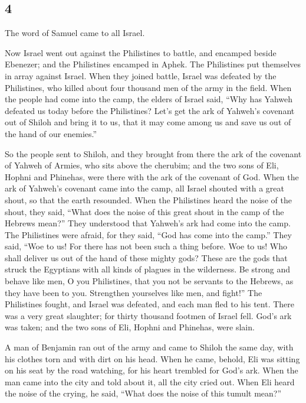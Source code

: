 \begin{paracol}{2}
\switchcolumn
\begin{otherlanguage}{english}

\hypertarget{section-7}{%
\section{4}\label{section-7}}

 The word of Samuel came to all Israel.

Now Israel went out against the Philistines to battle, and encamped
beside Ebenezer; and the Philistines encamped in Aphek. 
The Philistines put themselves in array against Israel. When they joined
battle, Israel was defeated by the Philistines, who killed about four
thousand men of the army in the field.  When the people
had come into the camp, the elders of Israel said, ``Why has Yahweh
defeated us today before the Philistines? Let's get the ark of Yahweh's
covenant out of Shiloh and bring it to us, that it may come among us and
save us out of the hand of our enemies.''

 So the people sent to Shiloh, and they brought from there
the ark of the covenant of Yahweh of Armies, who sits above the
cherubim; and the two sons of Eli, Hophni and Phinehas, were there with
the ark of the covenant of God.  When the ark of Yahweh's
covenant came into the camp, all Israel shouted with a great shout, so
that the earth resounded.  When the Philistines heard the
noise of the shout, they said, ``What does the noise of this great shout
in the camp of the Hebrews mean?'' They understood that Yahweh's ark had
come into the camp.  The Philistines were afraid, for they
said, ``God has come into the camp.'' They said, ``Woe to us! For there
has not been such a thing before.  Woe to us! Who shall
deliver us out of the hand of these mighty gods? These are the gods that
struck the Egyptians with all kinds of plagues in the wilderness.
 Be strong and behave like men, O you Philistines, that
you not be servants to the Hebrews, as they have been to you. Strengthen
yourselves like men, and fight!''  The Philistines
fought, and Israel was defeated, and each man fled to his tent. There
was a very great slaughter; for thirty thousand footmen of Israel fell.
 God's ark was taken; and the two sons of Eli, Hophni and
Phinehas, were slain.

 A man of Benjamin ran out of the army and came to Shiloh
the same day, with his clothes torn and with dirt on his head.
 When he came, behold, Eli was sitting on his seat by the
road watching, for his heart trembled for God's ark. When the man came
into the city and told about it, all the city cried out. 
When Eli heard the noise of the crying, he said, ``What does the noise
of this tumult mean?''


\end{otherlanguage}
\end{paracol}
